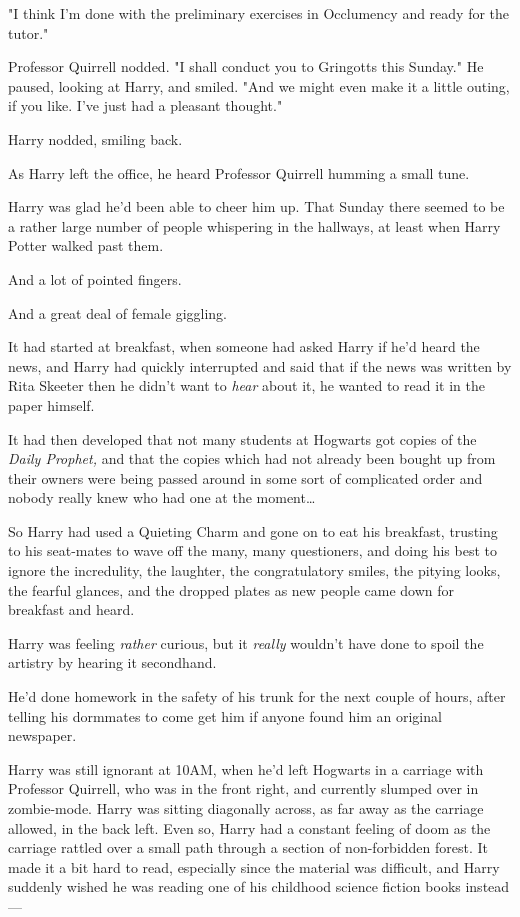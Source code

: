 "I think I'm done with the preliminary exercises in Occlumency and ready for 
the tutor."

Professor Quirrell nodded. "I shall conduct you to Gringotts this Sunday." He 
paused, looking at Harry, and smiled. "And we might even make it a little 
outing, if you like. I've just had a pleasant thought."

Harry nodded, smiling back.

As Harry left the office, he heard Professor Quirrell humming a small tune.

Harry was glad he'd been able to cheer him up.
\sbreak
That Sunday there seemed to be a rather large number of people whispering in 
the hallways, at least when Harry Potter walked past them.

And a lot of pointed fingers.

And a great deal of female giggling.

It had started at breakfast, when someone had asked Harry if he'd heard the 
news, and Harry had quickly interrupted and said that if the news was written 
by Rita Skeeter then he didn't want to \emph{hear} about it, he wanted to read 
it in the paper himself.

It had then developed that not many students at Hogwarts got copies of the 
\emph{Daily Prophet,} and that the copies which had not already been bought up 
from their owners were being passed around in some sort of complicated order 
and nobody really knew who had one at the moment{\ldots}

So Harry had used a Quieting Charm and gone on to eat his breakfast, trusting 
to his seat-mates to wave off the many, many questioners, and doing his best to 
ignore the incredulity, the laughter, the congratulatory smiles, the pitying 
looks, the fearful glances, and the dropped plates as new people came down for 
breakfast and heard.

Harry was feeling \emph{rather} curious, but it \emph{really} wouldn't have 
done to spoil the artistry by hearing it secondhand.

He'd done homework in the safety of his trunk for the next couple of hours, 
after telling his dormmates to come get him if anyone found him an original 
newspaper.

Harry was still ignorant at 10AM, when he'd left Hogwarts in a carriage with 
Professor Quirrell, who was in the front right, and currently slumped over in 
zombie-mode. Harry was sitting diagonally across, as far away as the carriage 
allowed, in the back left. Even so, Harry had a constant feeling of doom as the 
carriage rattled over a small path through a section of non-forbidden forest. 
It made it a bit hard to read, especially since the material was difficult, and 
Harry suddenly wished he was reading one of his childhood science fiction books 
instead---

